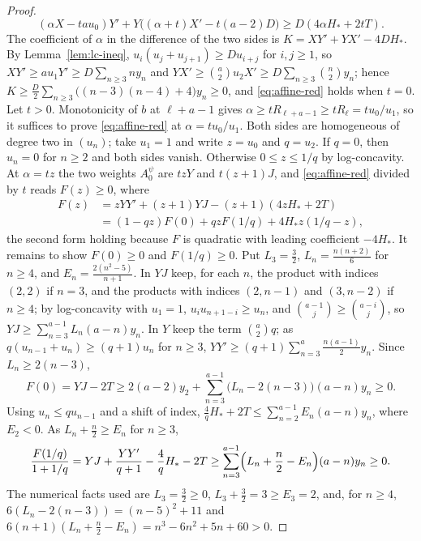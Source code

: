 \begin{proof}
\begin{equation}\label{eq:affine-red}
(\alpha X-tau_0)Y'+Y\bigl((\alpha+t)X'-t(a-2)D\bigr)\geq D(4\alpha H_*+2tT).
\end{equation}
The coefficient of $\alpha$ in the difference of the two sides is $K=XY'+YX'-4DH_*$. By Lemma~\ref{lem:lc-ineq}, $u_i(u_j+u_{j+1})\geq Du_{i+j}$ for $i,j\geq1$, so $XY'\geq au_1Y'\geq D\sum_{n\geq3}ny_n$ and $YX'\geq\binom a2u_2X'\geq D\sum_{n\geq3}\binom n2y_n$; hence $K\geq\frac D2\sum_{n\geq3}\bigl((n-3)(n-4)+4\bigr)y_n\geq0$, and \eqref{eq:affine-red} holds when $t=0$. Let $t>0$. Monotonicity of $b$ at $\ell+a-1$ gives $\alpha\geq tR_{\ell+a-1}\geq tR_\ell=tu_0/u_1$, so it suffices to prove \eqref{eq:affine-red} at $\alpha=tu_0/u_1$. Both sides are homogeneous of degree two in $(u_n)$; take $u_1=1$ and write $z=u_0$ and $q=u_2$. If $q=0$, then $u_n=0$ for $n\geq2$ and both sides vanish. Otherwise $0\leq z\leq1/q$ by log-concavity. At $\alpha=tz$ the two weights $A^\psi_0$ are $tzY$ and $t(z+1)J$, and \eqref{eq:affine-red} divided by $t$ reads $F(z)\geq0$, where
\[
\begin{aligned}
F(z)&=zYY'+(z+1)YJ-(z+1)(4zH_*+2T)\\
&=(1-qz)F(0)+qzF(1/q)+4H_*z(1/q-z),
\end{aligned}
\]
the second form holding because $F$ is quadratic with leading coefficient $-4H_*$. It remains to show $F(0)\geq0$ and $F(1/q)\geq0$. Put $L_3=\frac32$, $L_n=\frac{n(n+2)}6$ for $n\geq4$, and $E_n=\frac{2(n^2-5)}{n+1}$. In $YJ$ keep, for each $n$, the product with indices $(2,2)$ if $n=3$, and the products with indices $(2,n-1)$ and $(3,n-2)$ if $n\geq4$; by log-concavity with $u_1=1$, $u_iu_{n+1-i}\geq u_n$, and $\binom{a-1}j\geq\binom{a-i}j$, so $YJ\geq\sum_{n=3}^{a-1}L_n(a-n)y_n$. In $Y$ keep the term $\binom a2q$; as $q(u_{n-1}+u_n)\geq(q+1)u_n$ for $n\geq3$, $YY'\geq(q+1)\sum_{n=3}^a\frac{n(a-1)}2y_n$. Since $L_n\geq2(n-3)$,
\[
F(0)=YJ-2T\geq2(a-2)y_2+\sum_{n=3}^{a-1}\bigl(L_n-2(n-3)\bigr)(a-n)y_n\geq0.
\]
Using $u_n\leq qu_{n-1}$ and a shift of index, $\frac4qH_*+2T\leq\sum_{n=2}^{a-1}E_n(a-n)y_n$, where $E_2<0$. As $L_n+\frac n2\geq E_n$ for $n\geq3$,
\[
\frac{F(1/q)}{1+1/q}=YJ+\frac{YY'}{q+1}-\frac4qH_*-2T\geq\sum_{n=3}^{a-1}\Bigl(L_n+\frac n2-E_n\Bigr)(a-n)y_n\geq0.
\]
The numerical facts used are $L_3=\frac32\geq0$, $L_3+\frac32=3\geq E_3=2$, and, for $n\geq4$, $6(L_n-2(n-3))=(n-5)^2+11$ and $6(n+1)(L_n+\frac n2-E_n)=n^3-6n^2+5n+60>0$.


\end{proof}
